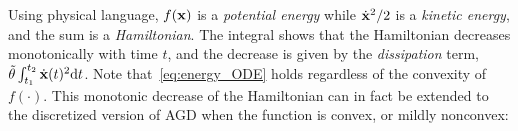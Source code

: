 \noindent
Using physical language, $f(\mathbf{x})$ is a \emph{potential energy} while $\dot{\mathbf{x}}^2/2$ is a
\emph{kinetic energy}, and the sum is a \emph{Hamiltonian}.  The integral shows that
the Hamiltonian decreases monotonically with time $t$, and the decrease is given by 
the \emph{dissipation} term, $\tilde{\theta}\int_{t_1}^{t_2}\dot{\mathbf{x}}(t)^2\mathrm{d}t$. 
Note that~\eqref{eq:energy_ODE} holds regardless of the convexity of $f(\cdot)$. 
This monotonic decrease of the Hamiltonian can in fact be extended to the discretized 
version of AGD when the function is convex, or mildly nonconvex:








